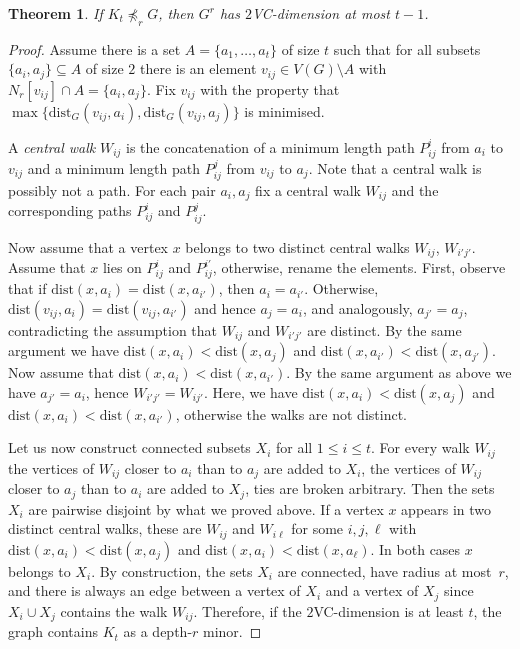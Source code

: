 \documentclass[11pt, fleqn]{article}
\theoremstyle{plain}
\newtheorem{theorem}{Theorem}
\theoremstyle{nonumberplain}
\newtheorem{proof}{Proof.}
\newcommand{\minor}{\preccurlyeq}
\newcommand{\dist}{\mathrm{dist}}
\begin{document}
\begin{theorem}
If $K_t\not\minor_rG$, then 
$G^r$ has $2$VC-dimension at most $t-1$. 
\end{theorem}
\begin{proof}
Assume there is a set $A=\{a_1,\ldots, a_t\}$ of size $t$ such that
for all subsets $\{a_i,a_j\}\subseteq A$ of size $2$ 
there is an element $v_{ij}\in V(G)\setminus A$ with 
$N_r[v_{ij}]\cap A=\{a_i,a_j\}$. Fix $v_{ij}$ with the property
that $\max\{\dist_G(v_{ij},a_i), \dist_G(v_{ij},a_j)\}$ is 
minimised. 

A \emph{central walk} $W_{ij}$ is the concatenation of a minimum length
path $P_{ij}^i$ from $a_i$ to $v_{ij}$ and a minimum length path $P_{ij}^j$ from $v_{ij}$ to $a_j$. 
Note that a central walk is possibly not a path. For each pair $a_i,a_j$ fix
a central walk $W_{ij}$ and the corresponding paths $P_{ij}^i$ and $P_{ij}^j$. 

Now assume that a vertex $x$ belongs to two distinct central 
walks $W_{ij}$, $W_{i'j'}$. Assume that $x$ lies on $P_{ij}^i$ and $P_{ij}^{i'}$,
otherwise, rename the elements. First, observe that if $\dist(x,a_i)=\dist(x,a_{i'})$, 
then $a_i=a_{i'}$. Otherwise, $\dist(v_{ij},a_{i})=\dist(v_{ij},a_{i'})$ and hence 
$a_j=a_i$, and analogously, $a_{j'}=a_j$, contradicting the assumption 
that $W_{ij}$ and $W_{i'j'}$ are distinct. By the same argument we have 
$\dist(x,a_i)<\dist(x,a_j)$ and $\dist(x,a_{i'})<\dist(x,a_{j'})$. 
Now assume that $\dist(x,a_i)<\dist(x,a_{i'})$. By the same argument as 
above we have $a_{j'}=a_i$, hence $W_{i'j'}=W_{ij'}$. Here, we have
$\dist(x,a_i)<\dist(x,a_j)$ and $\dist(x,a_{i})<\dist(x,a_{i'})$, 
otherwise the walks are not distinct. 

Let us now construct connected subsets $X_i$ for all $1\leq i\leq t$. 
For every walk $W_{ij}$ the vertices of $W_{ij}$ closer to $a_i$ than to $a_j$ 
are added to $X_i$, the vertices of $W_{ij}$ closer to $a_j$ than to $a_i$ 
are added to $X_j$, ties are broken arbitrary.
Then the sets $X_i$ are pairwise disjoint by what we proved above. If a vertex $x$
appears in two distinct central walks, these are $W_{ij}$ and $W_{i\ell}$ for some
$i,j,\ell$ with $\dist(x,a_i)<\dist(x,a_j)$ and $\dist(x,a_i)<\dist(x,a_\ell)$. 
In both cases $x$ belongs to $X_i$. By construction, the sets $X_i$ are connected, 
have radius at most~$r$, and 
there is always an edge between a vertex of $X_i$ and a vertex of $X_j$ since $X_i\cup X_j$ 
contains the walk $W_{ij}$. Therefore, if the $2$VC-dimension is at least $t$, the 
graph contains $K_t$ as a depth-$r$ minor. 
\end{proof}


 
\end{document}
